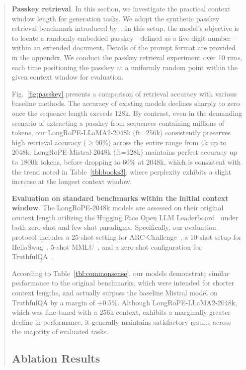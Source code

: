 \begin{abstract}
\textbf{Passkey retrieval}. In this section, we investigate the practical context window length for generation tasks. We adopt the synthetic passkey retrieval benchmark introduced by~\cite{passkey}. In this setup, the model's objective is to locate a randomly embedded passkey—defined as a five-digit number—within an extended document. Details of the prompt format are provided in the appendix. We conduct the passkey retrieval experiment over 10 runs, each time positioning the passkey at a uniformly random point within the given context window for evaluation.

Fig.~\ref{fig:passkey} presents a comparison of retrieval accuracy with various baseline methods. The accuracy of existing models declines sharply to zero once the sequence length exceeds 128k. By contrast, even in the demanding scenario of extracting a passkey from sequences containing millions of tokens, our LongRoPE-LLaMA2-2048k (ft=256k) consistently preserves high retrieval accuracy ($\ge$90\%) across the entire range from 4k up to 2048k. LongRoPE-Mistral-2048k (ft=128k) maintains perfect accuracy up to 1800k tokens, before dropping to 60\% at 2048k, which is consistent with the trend noted in Table~\ref{tbl:books3}, where perplexity exhibits a slight increase at the longest context window.

\textbf{Evaluation on standard benchmarks within the initial context window}. The LongRoPE-2048k models are assessed on their original context length utilizing the Hugging Face Open LLM Leaderboard~\cite{huggingfaceboard} under both zero-shot and few-shot paradigms. Specifically, our evaluation protocol includes a 25-shot setting for ARC-Challenge~\cite{allenai:arc}, a 10-shot setup for HellaSwag~\cite{zellers2019hellaswag}, 5-shot MMLU~\cite{mmlu}, and a zero-shot configuration for TruthfulQA~\cite{lin2021truthfulqa}.

According to Table~\ref{tbl:commonsense}, our models demonstrate similar performance to the original benchmarks, which were intended for shorter context lengths, and actually surpass the baseline Mistral model on TruthfulQA by a margin of +0.5\%. Although LongRoPE-LLaMA2-2048k, which was fine-tuned with a 256k context, exhibits a marginally greater decline in performance, it generally maintains satisfactory results across the majority of evaluated tasks.

\subsection{Ablation Results}


\end{abstract}
